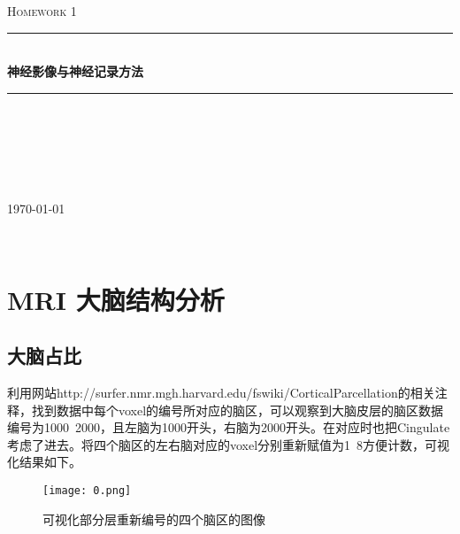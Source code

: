 \documentclass[11pt]{article}
\begin{document}
\begin{center}
\newcommand{\HRule}{\rule{\linewidth}{0.5mm}} %

\textsc{\LARGE Homework 1}  \\[0.5cm] %
\HRule \\[1cm]
{ \huge  \textbf{神经影像与神经记录方法}}\\[0.5cm] %
\HRule \\[1cm]
\begin{center}
\Large \emph{}\\
\\
\\ 
\end{center}
\begin{minipage}{0.4\textwidth}
\begin{center}
{\large \today}
\end{center}
\end{minipage}\\[2cm]
\end{center}


\section{MRI 大脑结构分析}
\subsection{大脑占比}
利用网站http://surfer.nmr.mgh.harvard.edu/fswiki/CorticalParcellation的相关注释，找到数据中每个voxel的编号所对应的脑区，可以观察到大脑皮层的脑区数据编号为1000~2000，且左脑为1000开头，右脑为2000开头。在对应时也把Cingulate考虑了进去。将四个脑区的左右脑对应的voxel分别重新赋值为1~8方便计数，可视化结果如下。

\begin{figure}[h]
\centering
\texttt{[image: 0.png]}
\caption{可视化部分层重新编号的四个脑区的图像}
\end{figure}
\end{document}
